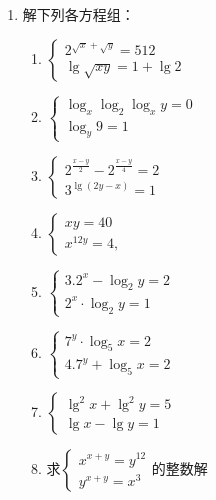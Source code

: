 \begin{enumerate}
\item 解下列各方程组：
\begin{multicols}{2}
\begin{enumerate}
  \item  $\begin{cases}2^{\sqrt{{x}}+\sqrt{y}}=512 \\ \lg \sqrt{x y}=1+\lg 2\end{cases}$
\item  $\begin{cases}\log _{x} \log _{2} \log _{x} y=0 \\ \log _{y} 9=1\end{cases}$
\item  $\begin{cases}2^{\tfrac{x-y}{2}}-2^{\tfrac{x-y}{4}}=2 \\ 3^{\lg(2 y-x)}=1\end{cases}$
\item $\begin{cases}x y=40 \\ x^{12 y}=4,\end{cases}$
\item  $\begin{cases}3.2^{x}-\log _{2} y=2 \\ 2^{x} \cdot \log _{2} y=1\end{cases}$
\item  $\begin{cases}7^{y} \cdot \log _{5} x=2 \\ 4.7^{y}+\log _{5} x=2\end{cases}$
\item $\begin{cases}
\lg^2x+\lg^2y=5\\
\lg x-\lg y=1
\end{cases}$
\item 求$\begin{cases}
x^{x+y}=y^{12}\\
y^{x+y}=x^3
\end{cases}$的整数解
\end{enumerate}
\end{multicols}


\end{enumerate}
